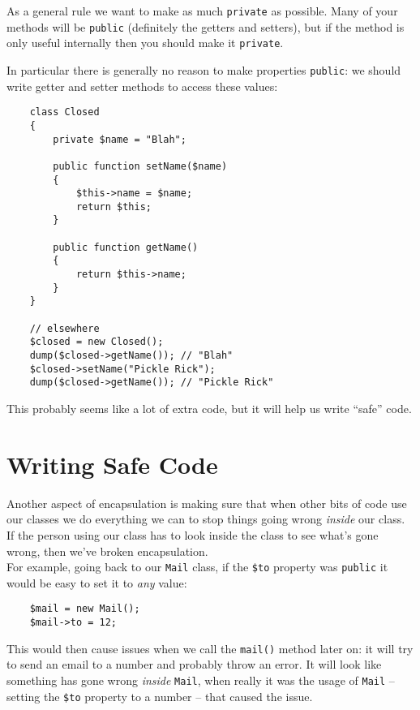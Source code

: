 As a general rule we want to make as much \texttt{private} as possible. Many of your methods will be \texttt{public} (definitely the getters and setters), but if the method is only useful internally then you should make it \texttt{private}.

\pagebreak

In particular there is generally no reason to make properties \texttt{public}: we should write getter and setter methods to access these values:

\begin{verbatim}
    class Closed
    {
        private $name = "Blah";

        public function setName($name)
        {
            $this->name = $name;
            return $this;
        }

        public function getName()
        {
            return $this->name;
        }
    }

    // elsewhere
    $closed = new Closed();
    dump($closed->getName()); // "Blah"
    $closed->setName("Pickle Rick");
    dump($closed->getName()); // "Pickle Rick"
\end{verbatim}

This probably seems like a lot of extra code, but it will help us write ``safe'' code.


\section{Writing Safe Code}

Another aspect of encapsulation is making sure that when other bits of code use our classes we do everything we can to stop things going wrong \textit{inside} our class. If the person using our class has to look inside the class to see what's gone wrong, then we've broken encapsulation.
\\

For example, going back to our \texttt{Mail} class, if the \texttt{\$to} property was \texttt{public} it would be easy to set it to \textit{any} value:

\begin{verbatim}
    $mail = new Mail();
    $mail->to = 12;
\end{verbatim}

This would then cause issues when we call the \texttt{mail()} method later on: it will try to send an email to a number and probably throw an error. It will look like something has gone wrong \textit{inside} \texttt{Mail}, when really it was the usage of \texttt{Mail} – setting the \texttt{\$to} property to a number – that caused the issue.
\\

